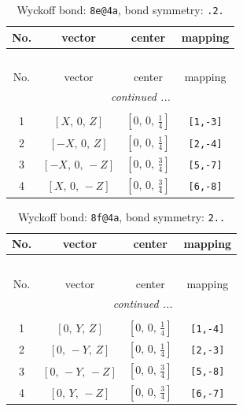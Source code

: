 \documentclass[fleqn,8pt]{jsarticle}
\begin{document}
\renewcommand{\arraystretch}{1.2}
\begin{longtable}{cccc}
\caption{Wyckoff bond: {\tt 8e@4a}, bond symmetry: {\tt .2.}}
 \\
 \hline \hline
No. & vector & center & mapping \\ \hline \endfirsthead

\multicolumn{3}{l}{\tablename\ \thetable{}} \\
 \hline \hline
No. & vector & center & mapping \\ \hline \endhead

 \hline \hline
\multicolumn{3}{r}{\footnotesize\it continued ...} \\ \endfoot

 \hline \hline
\multicolumn{3}{r}{} \\ \endlastfoot

1 & $\left[ X,\, 0,\, Z \right]$ & $\left[ 0,\, 0,\, \frac{1}{4} \right]$ & {\tt [1,-3]} \\ \hline
2 & $\left[ - X,\, 0,\, Z \right]$ & $\left[ 0,\, 0,\, \frac{1}{4} \right]$ & {\tt [2,-4]} \\ \hline
3 & $\left[ - X,\, 0,\, - Z \right]$ & $\left[ 0,\, 0,\, \frac{3}{4} \right]$ & {\tt [5,-7]} \\ \hline
4 & $\left[ X,\, 0,\, - Z \right]$ & $\left[ 0,\, 0,\, \frac{3}{4} \right]$ & {\tt [6,-8]} \\
\end{longtable}
\renewcommand{\arraystretch}{1.2}
\begin{longtable}{cccc}
\caption{Wyckoff bond: {\tt 8f@4a}, bond symmetry: {\tt 2..}}
 \\
 \hline \hline
No. & vector & center & mapping \\ \hline \endfirsthead

\multicolumn{3}{l}{\tablename\ \thetable{}} \\
 \hline \hline
No. & vector & center & mapping \\ \hline \endhead

 \hline \hline
\multicolumn{3}{r}{\footnotesize\it continued ...} \\ \endfoot

 \hline \hline
\multicolumn{3}{r}{} \\ \endlastfoot

1 & $\left[ 0,\, Y,\, Z \right]$ & $\left[ 0,\, 0,\, \frac{1}{4} \right]$ & {\tt [1,-4]} \\ \hline
2 & $\left[ 0,\, - Y,\, Z \right]$ & $\left[ 0,\, 0,\, \frac{1}{4} \right]$ & {\tt [2,-3]} \\ \hline
3 & $\left[ 0,\, - Y,\, - Z \right]$ & $\left[ 0,\, 0,\, \frac{3}{4} \right]$ & {\tt [5,-8]} \\ \hline
4 & $\left[ 0,\, Y,\, - Z \right]$ & $\left[ 0,\, 0,\, \frac{3}{4} \right]$ & {\tt [6,-7]} \\
\end{longtable}
\end{document}
